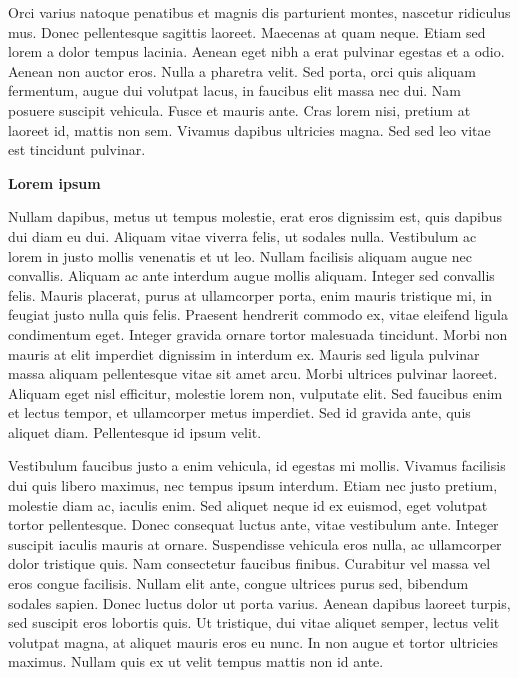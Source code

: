 \documentclass[
]{book}
\begin{document}
Orci varius natoque penatibus et magnis dis parturient montes, nascetur
ridiculus mus. Donec pellentesque sagittis laoreet. Maecenas at quam
neque. Etiam sed lorem a dolor tempus lacinia. Aenean eget nibh a erat
pulvinar egestas et a odio. Aenean non auctor eros. Nulla a pharetra
velit. Sed porta, orci quis aliquam fermentum, augue dui volutpat lacus,
in faucibus elit massa nec dui. Nam posuere suscipit vehicula. Fusce et
mauris ante. Cras lorem nisi, pretium at laoreet id, mattis non sem.
Vivamus dapibus ultricies magna. Sed sed leo vitae est tincidunt
pulvinar.

\textbf{Lorem ipsum}

Nullam dapibus, metus ut tempus molestie, erat eros dignissim est, quis
dapibus dui diam eu dui. Aliquam vitae viverra felis, ut sodales nulla.
Vestibulum ac lorem in justo mollis venenatis et ut leo. Nullam
facilisis aliquam augue nec convallis. Aliquam ac ante interdum augue
mollis aliquam. Integer sed convallis felis. Mauris placerat, purus at
ullamcorper porta, enim mauris tristique mi, in feugiat justo nulla quis
felis. Praesent hendrerit commodo ex, vitae eleifend ligula condimentum
eget. Integer gravida ornare tortor malesuada tincidunt. Morbi non
mauris at elit imperdiet dignissim in interdum ex. Mauris sed ligula
pulvinar massa aliquam pellentesque vitae sit amet arcu. Morbi ultrices
pulvinar laoreet. Aliquam eget nisl efficitur, molestie lorem non,
vulputate elit. Sed faucibus enim et lectus tempor, et ullamcorper metus
imperdiet. Sed id gravida ante, quis aliquet diam. Pellentesque id ipsum
velit.

Vestibulum faucibus justo a enim vehicula, id egestas mi mollis. Vivamus
facilisis dui quis libero maximus, nec tempus ipsum interdum. Etiam nec
justo pretium, molestie diam ac, iaculis enim. Sed aliquet neque id ex
euismod, eget volutpat tortor pellentesque. Donec consequat luctus ante,
vitae vestibulum ante. Integer suscipit iaculis mauris at ornare.
Suspendisse vehicula eros nulla, ac ullamcorper dolor tristique quis.
Nam consectetur faucibus finibus. Curabitur vel massa vel eros congue
facilisis. Nullam elit ante, congue ultrices purus sed, bibendum sodales
sapien. Donec luctus dolor ut porta varius. Aenean dapibus laoreet
turpis, sed suscipit eros lobortis quis. Ut tristique, dui vitae aliquet
semper, lectus velit volutpat magna, at aliquet mauris eros eu nunc. In
non augue et tortor ultricies maximus. Nullam quis ex ut velit tempus
mattis non id ante.
\end{document}
